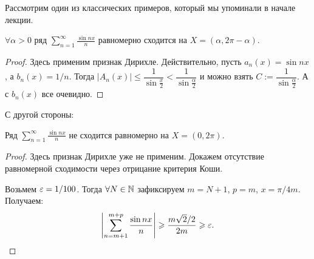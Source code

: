 	
	Рассмотрим один из классических примеров, который мы упоминали в начале лекции.
	\begin{Examples}
		$\forall \alpha > 0$ ряд $\sum\limits_{n = 1}^\infty \frac{\sin nx}{n}$ равномерно сходится на $X=(\alpha, 2\pi-\alpha)$.
	\end{Examples}
	
	\begin{proof} 
	Здесь применим признак Дирихле. Действительно, пусть $a_n(x) = \sin nx$, а $b_n(x) = 1/n$. Тогда $|A_n(x)| \leq \dfrac{1}{\sin \frac{x}{2}} < \dfrac{1}{\sin \frac{\alpha}{2}}$ и можно взять $C:= \dfrac{1}{\sin \frac{\alpha}{2}}$. А с $b_n(x)$ все очевидно.
	\end{proof}
	
	С другой стороны:
	\begin{Examples}
		Ряд $\sum\limits_{n = 1}^\infty \frac{\sin nx}{n}$ не сходится равномерно на $X=(0, 2\pi)$.
	\end{Examples}
	\begin{proof}
		Здесь признак Дирихле уже не применим. Докажем отсутствие равномерной сходимости через отрицание критерия Коши.
		
		Возьмем $\varepsilon = 1/100$. Тогда $\forall N \in \mathbb{N}$ зафиксируем $m = N+1$, $p = m$, $x = \pi/4m$. Получаем:
		$$
		\left| \sum\limits_{n=m+1}^{m+p} \frac{\sin nx}{n} \right| \geqslant \dfrac{m\sqrt{2} / 2}{2m} \geqslant \varepsilon.
		$$
	\end{proof}

